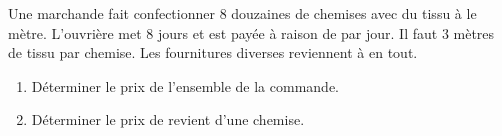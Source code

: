 \begin{exercice*}
   Une marchande fait confectionner 8 douzaines de chemises avec du tissu à  le mètre. L'ouvrière met 8 jours et est payée à raison de  par jour. Il faut 3 mètres de tissu par chemise. Les fournitures diverses reviennent à  en tout.
   \begin{enumerate}
      \item Déterminer le prix de l'ensemble de la commande.
      \item Déterminer le prix de revient d'une chemise.
    \end{enumerate}
\end{exercice*}